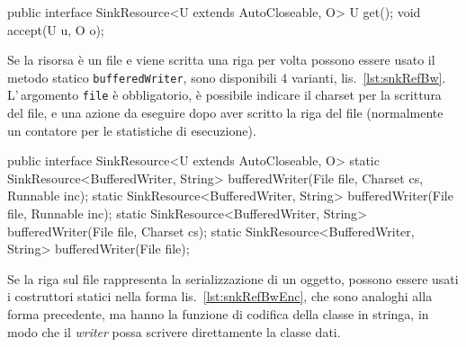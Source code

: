 \begin{elisting}[!htb]
\begin{javacode}
public interface SinkResource<U extends AutoCloseable, O> {
    U get();
    void accept(U u, O o);
}
\end{javacode}
\caption{Metodi per aprire la risorsa e scrivere i dati}
\label{lst:snkRef}
\end{elisting}

Se la risorsa è un file e viene scritta una riga per volta possono essere usato
il metodo statico \texttt{bufferedWriter}, sono disponibili 4 varianti,
lis.~\ref{lst:snkRefBw}. L'\,argomento \texttt{file} è obbligatorio, è possibile
indicare il charset per la scrittura del file, e una azione da eseguire dopo
aver scritto la riga del file (normalmente un contatore per le statistiche di
esecuzione).

\begin{elisting}[!htb]
\begin{javacode}
public interface SinkResource<U extends AutoCloseable, O> {
    static SinkResource<BufferedWriter, String> bufferedWriter(File file, Charset cs, Runnable inc);
    static SinkResource<BufferedWriter, String> bufferedWriter(File file, Runnable inc);
    static SinkResource<BufferedWriter, String> bufferedWriter(File file, Charset cs);
    static SinkResource<BufferedWriter, String> bufferedWriter(File file);
}
\end{javacode}
\caption{Metodi per creare una risorsa \texttt{SinkResource<BufferedWriter, String>}}
\label{lst:snkRefBw}
\end{elisting}

Se la riga sul file rappresenta la serializzazione di un oggetto, possono essere
usati i costruttori statici nella forma lis.~\ref{lst:snkRefBwEnc}, che sono
analoghi alla forma precedente, ma hanno la funzione di codifica della classe
in stringa, in modo che il \textit{writer} possa scrivere direttamente la classe
dati.

